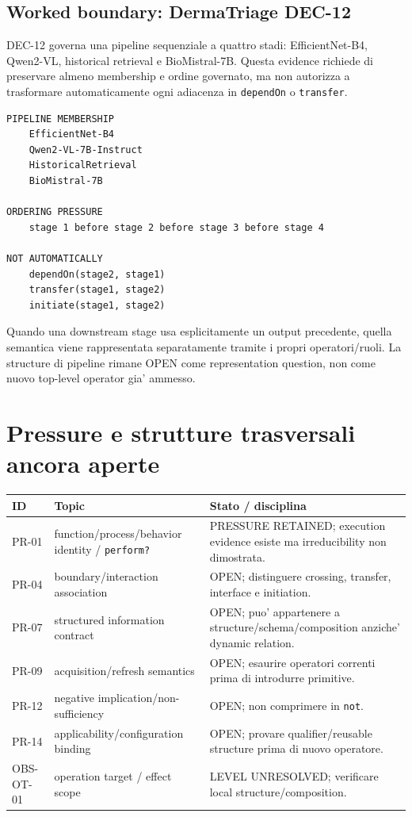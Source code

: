 \documentclass[11pt,a4paper]{article}
\begin{document}
\subsection{Worked boundary: DermaTriage DEC-12}
DEC-12 governa una pipeline sequenziale a quattro stadi: EfficientNet-B4, Qwen2-VL, historical retrieval e BioMistral-7B. Questa evidence richiede di preservare almeno membership e ordine governato, ma non autorizza a trasformare automaticamente ogni adiacenza in \texttt{dependOn} o \texttt{transfer}.\par
\begin{lstlisting}
PIPELINE MEMBERSHIP
    EfficientNet-B4
    Qwen2-VL-7B-Instruct
    HistoricalRetrieval
    BioMistral-7B

ORDERING PRESSURE
    stage 1 before stage 2 before stage 3 before stage 4

NOT AUTOMATICALLY
    dependOn(stage2, stage1)
    transfer(stage1, stage2)
    initiate(stage1, stage2)
\end{lstlisting}
Quando una downstream stage usa esplicitamente un output precedente, quella semantica viene rappresentata separatamente tramite i propri operatori/ruoli. La structure di pipeline rimane OPEN come representation question, non come nuovo top-level operator gia' ammesso.


\section{Pressure e strutture trasversali ancora aperte}

\begin{longtable}{L{25mm}L{52mm}L{62mm}}
\toprule
\textbf{ID} & \textbf{Topic} & \textbf{Stato / disciplina} \\
\midrule\endhead
PR-01 & function/process/behavior identity / \texttt{perform?} & PRESSURE RETAINED; execution evidence esiste ma irreducibility non dimostrata. \\
PR-04 & boundary/interaction association & OPEN; distinguere crossing, transfer, interface e initiation. \\
PR-07 & structured information contract & OPEN; puo' appartenere a structure/schema/composition anziche' dynamic relation. \\
PR-09 & acquisition/refresh semantics & OPEN; esaurire operatori correnti prima di introdurre primitive. \\
PR-12 & negative implication/non-sufficiency & OPEN; non comprimere in \texttt{not}. \\
PR-14 & applicability/configuration binding & OPEN; provare qualifier/reusable structure prima di nuovo operatore. \\
OBS-OT-01 & operation target / effect scope & LEVEL UNRESOLVED; verificare local structure/composition. \\
\bottomrule
\end{longtable}
\end{document}
